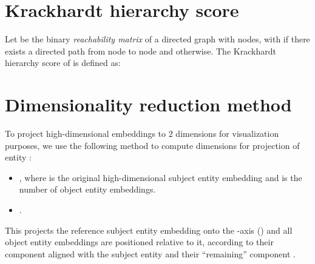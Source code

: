 \documentclass{article}
\begin{document}
\section{Krackhardt hierarchy score}\label{sec:krackhardt}
Let  be the binary \textit{reachability matrix} of a directed graph  with  nodes, with  if there exists a directed path from node  to node  and  otherwise. The Krackhardt hierarchy score of  \cite{krackhardt1994graph} is defined as: 



\section{Dimensionality reduction method}\label{sec:dimred}
To project high-dimensional embeddings to 2 dimensions for visualization purposes, we use the following method to compute dimensions  for projection  of entity :
\begin{itemize}
    \item , where  is the original high-dimensional subject entity embedding and  is the number of object entity embeddings.
    \item .
\end{itemize}
This projects the reference subject entity embedding onto the -axis () and all object entity embeddings are positioned relative to it, according to their  component aligned with the subject entity and their ``remaining'' component .
\end{document}
